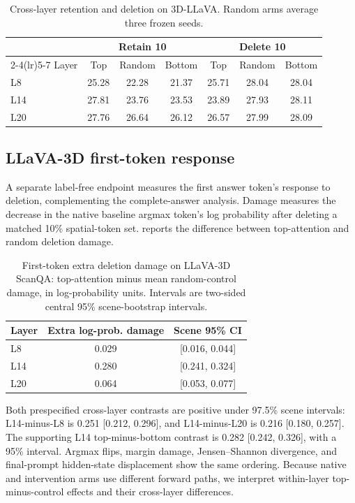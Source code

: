 \begin{table}[t]
\centering
\caption{Cross-layer retention and deletion on 3D-LLaVA. Random arms average three frozen seeds.}
\label{tab:supp_stage}
\begin{tabular}{lcccccc}
\toprule
& \multicolumn{3}{c}{Retain 10} & \multicolumn{3}{c}{Delete 10} \\
\cmidrule(lr){2-4}\cmidrule(lr){5-7}
Layer & Top & Random & Bottom & Top & Random & Bottom \\
\midrule
L8 & 25.28 & 22.28 & 21.37 & 25.71 & 28.04 & 28.04 \\
L14 & 27.81 & 23.76 & 23.53 & 23.89 & 27.93 & 28.11 \\
L20 & 27.76 & 26.64 & 26.12 & 26.57 & 27.99 & 28.09 \\
\bottomrule
\end{tabular}
\end{table}

\subsection{LLaVA-3D first-token response}
A separate label-free endpoint measures the first answer token's response to deletion, complementing the complete-answer analysis. Damage measures the decrease in the native baseline argmax token's log probability after deleting a matched 10\% spatial-token set.  reports the difference between top-attention and random deletion damage.

\begin{table}[t]
\centering
\caption{First-token extra deletion damage on LLaVA-3D ScanQA: top-attention minus mean random-control damage, in log-probability units. Intervals are two-sided central 95\% scene-bootstrap intervals.}
\label{tab:supp_firsttoken}
\begin{tabular}{lcc}
\toprule
Layer & Extra log-prob. damage & Scene 95\% CI \\
\midrule
L8 & 0.029 & [0.016, 0.044] \\
L14 & 0.280 & [0.241, 0.324] \\
L20 & 0.064 & [0.053, 0.077] \\
\bottomrule
\end{tabular}
\end{table}

Both prespecified cross-layer contrasts are positive under 97.5\% scene intervals: L14-minus-L8 is 0.251 [0.212, 0.296], and L14-minus-L20 is 0.216 [0.180, 0.257]. The supporting L14 top-minus-bottom contrast is 0.282 [0.242, 0.326], with a 95\% interval. Argmax flips, margin damage, Jensen--Shannon divergence, and final-prompt hidden-state displacement show the same ordering. Because native and intervention arms use different forward paths, we interpret within-layer top-minus-control effects and their cross-layer differences.

